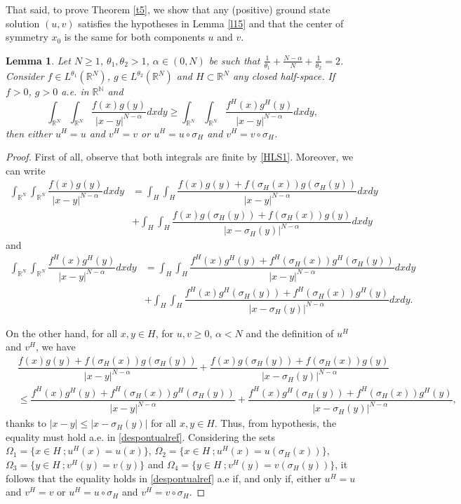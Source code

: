 \documentclass[12pt,a4paper]{article}
\newtheorem{lemma}[theorem]{Lemma}
\numberwithin{equation}{section}
\begin{document}
That said, to prove Theorem \ref{t5}, we show that any (positive) ground state solution $(u,v)$ satisfies the hypotheses in Lemma \ref{l15} and that the center of symmetry $x_0$ is the same for both components $u$ and $v$.

\begin{lemma}\label{l16}
Let $N\geq1$, $\theta_1, \theta_2 > 1$, $\alpha\in(0,N)$ be such that $\frac{1}{\theta_1} + \frac{N-\alpha}{N} + \frac{1}{\theta_2} = 2$. Consider $f\in L^{\theta_1}(\mathbb{R}^N)$, $g \in L^{\theta_2}(\mathbb{R}^N)$ and $H\subset \mathbb{R}^N$ any closed half-space. If $f> 0$, $g > 0$ a.e. in $\mathbb{R^N}$ and
$$
\int_{\mathbb{R}^N} \int_{\mathbb{R}^N} \dfrac{f(x)g(y)}{|x-y|^{N-\alpha}} dx dy \geq \int_{\mathbb{R}^N} \int_{\mathbb{R}^N} \dfrac{f^H(x)g^H(y)}{|x-y|^{N-\alpha}} dx dy, 
$$
then either $u^H = u$ and $v^H = v$ or $u^H = u\circ \sigma_H $ and $v^H = v\circ \sigma_H$.
\end{lemma}
\begin{proof}
First of all, observe that both integrals are finite by \eqref{HLS1}. Moreover, we can write
\begin{align*}
\int_{\mathbb{R}^N} \int_{\mathbb{R}^N} \dfrac{f(x)g(y)}{|x-y|^{N-\alpha}} dx dy &= \int_{H} \int_{H} \dfrac{f(x)g(y)+f(\sigma_H(x))g(\sigma_H(y))}{|x-y|^{N-\alpha}} dx dy  \\ & +\int_{H} \int_{H}\dfrac{f(x)g(\sigma_H(y))+f(\sigma_H(x))g(y)}{|x-\sigma_H(y)|^{N-\alpha}} dx dy
\end{align*}
and
\begin{align*}
\int_{\mathbb{R}^N} \int_{\mathbb{R}^N} \dfrac{f^H(x)g^H(y)}{|x-y|^{N-\alpha}} dx dy &= \int_{H} \int_{H} \dfrac{f^H(x)g^H(y)+f^H(\sigma_H(x))g^H(\sigma_H(y))}{|x-y|^{N-\alpha}}dx dy\\& + \int_{H} \int_{H}\dfrac{f^H(x)g^H(\sigma_H(y))+f^H(\sigma_H(x))g^H(y)}{|x-\sigma_H(y)|^{N-\alpha}} dx dy.
\end{align*}

On the other hand, for all $x, y\in H$, for $u, v \geq 0$, $\alpha < N$ and the definition of $u^H$ and $v^H$, we have
\begin{align}\label{despontualref}
& \dfrac{f(x)g(y)+f(\sigma_H(x))g(\sigma_H(y))}{|x-y|^{N-\alpha}} + \dfrac{f(x)g(\sigma_H(y))+f(\sigma_H(x))g(y)}{|x-\sigma_H(y)|^{N-\alpha}} \\
& \leq \dfrac{f^H(x)g^H(y)+f^H(\sigma_H(x))g^H(\sigma_H(y))}{|x-y|^{N-\alpha}} + \dfrac{f^H(x)g^H(\sigma_H(y))+f^H(\sigma_H(x))g^H(y)}{|x-\sigma_H(y)|^{N-\alpha}} \nonumber,
\end{align}
thanks to $|x-y| \leq |x-\sigma_H(y)|$ for all $x,y \in H$.
Thus, from hypothesis, the equality must hold a.e. in \eqref{despontualref}. Considering the sets $\Omega_1 = \{ x\in H \ ; u^H(x) = u(x)\}$, $\Omega_2 = \{ x\in H \ ; u^H(x) = u(\sigma_H(x))\}$, $\Omega_3 = \{ y\in H \ ; v^H(y) = v(y)\}$ and $\Omega_4 = \{ y\in H \ ; v^H(y) = v(\sigma_H(y))\}$, it follows that the equality holds in \eqref{despontualref} a.e if, and only if, either $u^H = u$ and $v^H = v$ or $u^H = u\circ \sigma_H $ and $v^H = v\circ \sigma_H$.
\end{proof}
\end{document}
